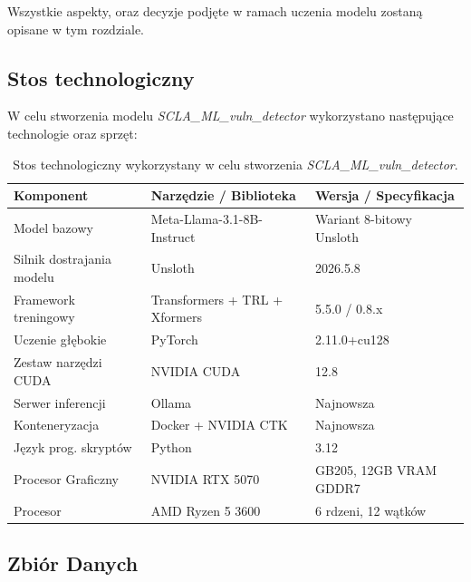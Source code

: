\documentclass[12pt,a4paper]{article}
\begin{document}
Wszystkie aspekty, oraz decyzje podjęte w ramach uczenia modelu zostaną opisane w tym rozdziale.


\subsection{Stos technologiczny}

W celu stworzenia modelu \emph{SCLA\_ML\_vuln\_detector} wykorzystano następujące technologie oraz sprzęt:

\begin{table}[H]
    \centering
    \begin{tabular}{lll}
        \toprule
        \textbf{Komponent}          & \textbf{Narzędzie / Biblioteka}   & \textbf{Wersja / Specyfikacja} \\
        \midrule
        Model bazowy                & Meta-Llama-3.1-8B-Instruct        & Wariant 8-bitowy Unsloth \\
        Silnik dostrajania modelu   & Unsloth                           & 2026.5.8 \\
        Framework treningowy        & Transformers + TRL + Xformers     & 5.5.0 / 0.8.x \\
        Uczenie głębokie            & PyTorch                           & 2.11.0+cu128 \\
        Zestaw narzędzi CUDA        & NVIDIA CUDA                       & 12.8 \\
        Serwer inferencji           & Ollama                            & Najnowsza \\
        Konteneryzacja              & Docker + NVIDIA CTK               & Najnowsza \\
        Język prog. skryptów        & Python                            & 3.12 \\
        Procesor Graficzny          & NVIDIA RTX 5070                   & GB205, 12GB VRAM GDDR7 \\
        Procesor                    & AMD Ryzen 5 3600                  & 6 rdzeni, 12 wątków \\
        \bottomrule
    \end{tabular}
    \caption{Stos technologiczny wykorzystany w celu stworzenia \emph{SCLA\_ML\_vuln\_detector}.}
\end{table}


\subsection{Zbiór Danych}
\label{ssec:model_dataset}
\end{document}
